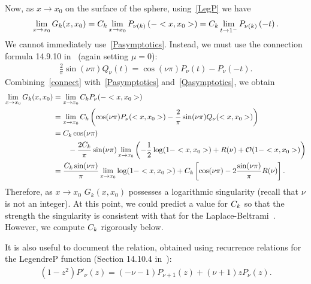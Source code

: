 Now, as $x\rightarrow x_{0}$ on the surface of the sphere,
using~\eqref{LegP} we have 
\begin{align*}
  \lim_{x\rightarrow x_{0}}G_k(x,x_{0}) =
  C_k\lim_{x\rightarrow x_{0}} P_{\nu(k)}\left(-<x,x_{0}>\right) =
  C_k\lim_{t\rightarrow 1^-}P_{\nu(k)}\left(-t\right).
\end{align*}
We cannot immediately use~\eqref{Pasymptotics}. Instead, we must use the
connection formula 14.9.10 in~\cite{fatAbramowitz} (again setting
$\mu=0$):
\begin{align}
  \frac{2}{\pi}\sin(\nu \pi)Q_\nu(t)= \cos(\nu\pi)P_\nu(t) - P_\nu(-t).
  \label{connect}
\end{align}
Combining~\eqref{connect} with~\eqref{Pasymptotics}
and~\eqref{Qasymptotics}, we obtain
\begin{align}
  \lim_{x\rightarrow x_{0}}G_k(x,x_{0}) &= \lim_{x\rightarrow x_{0}}
      C_k P_{\nu}(-<x,x_{0}>) \nonumber \\
  &= \lim_{x\rightarrow x_{0} }C_k\left(\cos(\nu\pi)
  P_{\nu}(<x,x_{0}>) - 
      \frac{2}{\pi}\sin(\nu \pi)Q_{\nu}(<x,x_0>)\right) \nonumber \\
  &= C_k\cos(\nu\pi)  \\
  & \qquad - \frac{2C_k}{\pi}\sin(\nu\pi)\lim_{x\rightarrow x_0} 
      \left(-\frac{1}{2}\log(1-<x,x_0>) + R(\nu) +
      \mathcal{O}(1-<x,x_0>)\right) \nonumber \\
  &=\frac{C_k\sin(\nu\pi)}{\pi}\lim_{x\rightarrow x_0}
      \log(1-<x,x_0>) + C_k\left[\cos(\nu\pi)-
      2\frac{\sin(\nu\pi)}{\pi}R(\nu)\right].
  \label{e:logSingularity}
\end{align}
Therefore, as $x\rightarrow x_{0}$ $G_k(x,x_{0})$ possesses a
logarithmic singularity (recall that $\nu$ is not an integer).  At this
point, we could predict a value for $C_k$ so that the strength the
singularity is consistent with that for the
Laplace-Beltrami~\cite{gemmrich}.  However, we compute $C_k$ rigorously
below.

It is also useful to document the relation, obtained using recurrence
relations for the LegendreP function (Section 14.10.4
in~\cite{fatAbramowitz}):
\begin{align*} 
  (1-z^2) P'_\nu(z) = (-\nu-1) P_{\nu+1}(z) + (\nu+1)z P_\nu(z).
\end{align*}

